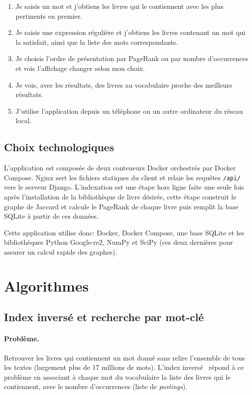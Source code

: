 \documentclass[11pt,a4paper]{article}
\begin{document}
\begin{enumerate}
    \item Je saisis un mot et j'obtiens les livres qui le contiennent avec les plus pertinents en premier.
    \item Je saisis une expression régulière et j'obtiens les livres contenant un mot qui la satisfait, ainsi que la liste des mots correspondants.
    \item Je choisis l'ordre de présentation par PageRank ou par nombre d'occurrences et vois l'affichage changer selon mon choix.
    \item Je vois, avec les résultats, des livres au vocabulaire proche des meilleurs résultats.
    \item J'utilise l'application depuis un téléphone ou un autre ordinateur du réseau local.
\end{enumerate}

\subsection{Choix technologiques}

L'application est composée de deux conteneurs Docker orchestrés par Docker Compose. Nginx sert les fichiers statiques du client et relaie les requêtes \texttt{/api/} vers le serveur Django. L'indexation est une étape hors ligne faite une seule fois après l'installation de la bibliothèque de livre désirée, cette étape construit le graphe de Jaccard et calcule le PageRank de chaque livre puis remplit la base SQLite à partir de ces données.

Cette application utilise donc: Docker, Docker Compose, une base SQLite et les bibliothèques Python Google-re2, NumPy et SciPy (ces deux dernières pour assurer un calcul rapide des graphes).

\section{Algorithmes}

\subsection{Index inversé et recherche par mot-clé}

\paragraph{Problème.}
Retrouver les livres qui contiennent un mot donné sans relire l'ensemble de tous les textes (largement plus de 17 millions de mots). L'index inversé~\cite{iir} répond à ce problème en associant à chaque mot du vocabulaire la liste des livres qui le contiennent, avec le nombre d'occurrences (liste de \emph{postings}).
\end{document}
